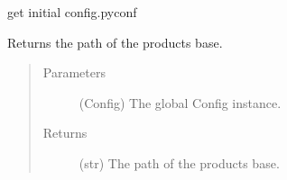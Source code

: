 \documentclass[a4paper,10pt,english]{sphinxmanual}
\begin{document}

\begin{fulllineitems}
\label{\detokenize{apidoc_src/src:src.utilsSat.get_CONFIG_FILENAME}}
get initial config.pyconf

\end{fulllineitems}


\begin{fulllineitems}
\label{\detokenize{apidoc_src/src:src.utilsSat.get_base_path}}
Returns the path of the products base.
\begin{quote}\begin{description}
\item[{Parameters}] \leavevmode
{} \textendash{} (Config) The global Config instance.

\item[{Returns}] \leavevmode
(str) The path of the products base.

\end{description}\end{quote}

\end{fulllineitems}

\end{document}
